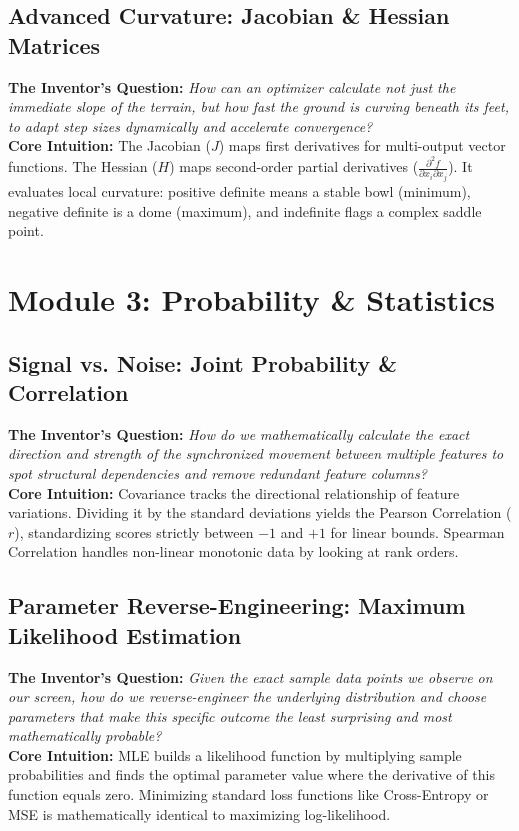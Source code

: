 \documentclass[12pt,a4paper]{article}
\begin{document}
\subsection{Advanced Curvature: Jacobian \& Hessian Matrices}
\textbf{The Inventor's Question:} \textit{How can an optimizer calculate not just the immediate slope of the terrain, but how fast the ground is curving beneath its feet, to adapt step sizes dynamically and accelerate convergence?} \\
\textbf{Core Intuition:} The Jacobian ($J$) maps first derivatives for multi-output vector functions. The Hessian ($H$) maps second-order partial derivatives ($\frac{\partial^2 f}{\partial x_i \partial x_j}$). It evaluates local curvature: positive definite means a stable bowl (minimum), negative definite is a dome (maximum), and indefinite flags a complex saddle point.

\section{Module 3: Probability \& Statistics}
\subsection{Signal vs. Noise: Joint Probability \& Correlation}
\textbf{The Inventor's Question:} \textit{How do we mathematically calculate the exact direction and strength of the synchronized movement between multiple features to spot structural dependencies and remove redundant feature columns?} \\
\textbf{Core Intuition:} Covariance tracks the directional relationship of feature variations. Dividing it by the standard deviations yields the Pearson Correlation ($r$), standardizing scores strictly between $-1$ and $+1$ for linear bounds. Spearman Correlation handles non-linear monotonic data by looking at rank orders.

\subsection{Parameter Reverse-Engineering: Maximum Likelihood Estimation}
\textbf{The Inventor's Question:} \textit{Given the exact sample data points we observe on our screen, how do we reverse-engineer the underlying distribution and choose parameters that make this specific outcome the least surprising and most mathematically probable?} \\
\textbf{Core Intuition:} MLE builds a likelihood function by multiplying sample probabilities and finds the optimal parameter value where the derivative of this function equals zero. Minimizing standard loss functions like Cross-Entropy or MSE is mathematically identical to maximizing log-likelihood.
\end{document}
